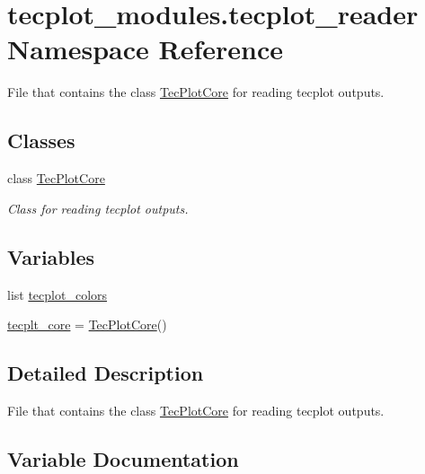 \hypertarget{a00065}{}\section{tecplot\+\_\+modules.\+tecplot\+\_\+reader Namespace Reference}
\label{a00065}


File that contains the class \hyperlink{a00118}{Tec\+Plot\+Core} for reading tecplot outputs.  


\subsection*{Classes}
\begin{DoxyCompactItemize}
\item 
class \hyperlink{a00118}{Tec\+Plot\+Core}
\begin{DoxyCompactList}\small\item\em Class for reading tecplot outputs. \end{DoxyCompactList}\end{DoxyCompactItemize}
\subsection*{Variables}
\begin{DoxyCompactItemize}
\item 
list \hyperlink{a00065_a1e797fe85a325b8a8f10b118db5c9a47}{tecplot\+\_\+colors}
\item 
\hyperlink{a00065_a451a17322511f6ada93a0d61c5aa34c9}{tecplt\+\_\+core} = \hyperlink{a00118}{Tec\+Plot\+Core}()
\end{DoxyCompactItemize}


\subsection{Detailed Description}
File that contains the class \hyperlink{a00118}{Tec\+Plot\+Core} for reading tecplot outputs. 

\subsection{Variable Documentation}
\hypertarget{a00065_a1e797fe85a325b8a8f10b118db5c9a47}{}\label{a00065_a1e797fe85a325b8a8f10b118db5c9a47} 
